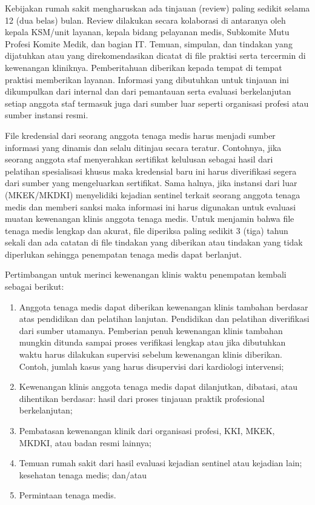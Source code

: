 \documentclass[
]{book}
\providecommand{\tightlist}{%
  \setlength{\itemsep}{0pt}\setlength{\parskip}{0pt}}
\begin{document}
Kebijakan rumah sakit mengharuskan ada tinjauan (review) paling sedikit selama 12 (dua belas) bulan. Review dilakukan secara kolaborasi di antaranya oleh kepala KSM/unit layanan, kepala bidang pelayanan medis, Subkomite Mutu Profesi Komite Medik, dan bagian IT. Temuan, simpulan, dan tindakan yang dijatuhkan atau yang direkomendasikan dicatat di file praktisi serta tercermin di kewenangan kliniknya. Pemberitahuan diberikan kepada tempat di tempat praktisi memberikan layanan.
Informasi yang dibutuhkan untuk tinjauan ini dikumpulkan dari internal dan dari pemantauan serta evaluasi berkelanjutan setiap anggota staf termasuk juga dari sumber luar seperti organisasi profesi atau sumber instansi resmi.

File kredensial dari seorang anggota tenaga medis harus menjadi sumber informasi yang dinamis dan selalu ditinjau secara teratur. Contohnya, jika seorang anggota staf menyerahkan sertifikat kelulusan sebagai hasil dari pelatihan spesialisasi khusus maka kredensial baru ini harus diverifikasi segera dari sumber yang mengeluarkan sertifikat. Sama halnya, jika instansi dari luar (MKEK/MKDKI) menyelidiki kejadian sentinel terkait seorang anggota tenaga medis dan memberi sanksi maka informasi ini harus digunakan untuk evaluasi muatan kewenangan klinis anggota tenaga medis. Untuk menjamin bahwa file tenaga medis lengkap dan akurat, file diperiksa paling sedikit 3 (tiga) tahun sekali dan ada catatan di file tindakan yang diberikan atau tindakan yang tidak diperlukan sehingga penempatan tenaga medis dapat berlanjut.

Pertimbangan untuk merinci kewenangan klinis waktu penempatan kembali sebagai berikut:

\begin{enumerate}
\def\labelenumi{\arabic{enumi}.}
\tightlist
\item
  Anggota tenaga medis dapat diberikan kewenangan klinis tambahan berdasar atas pendidikan dan pelatihan lanjutan. Pendidikan dan pelatihan diverifikasi dari sumber utamanya. Pemberian penuh kewenangan klinis tambahan mungkin ditunda sampai proses verifikasi lengkap atau jika dibutuhkan waktu harus dilakukan supervisi sebelum kewenangan klinis diberikan.
  Contoh, jumlah kasus yang harus disupervisi dari kardiologi intervensi;
\item
  Kewenangan klinis anggota tenaga medis dapat dilanjutkan, dibatasi, atau dihentikan berdasar: hasil dari proses tinjauan praktik profesional berkelanjutan;
\item
  Pembatasan kewenangan klinik dari organisasi profesi, KKI, MKEK, MKDKI, atau badan resmi lainnya;
\item
  Temuan rumah sakit dari hasil evaluasi kejadian sentinel atau kejadian lain; kesehatan tenaga medis; dan/atau
\item
  Permintaan tenaga medis.
\end{enumerate}
\end{document}
